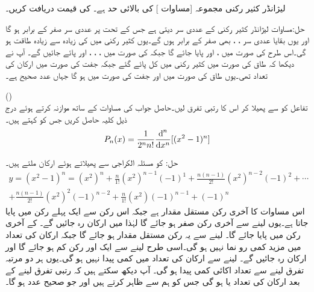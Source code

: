 لیژانڈر کثیر رکنی مجموعہ [مساوات ] کی بالائی حد  ہے۔ کی قیمت دریافت کریں۔

حل:مساوات  لیژانڈر کثیر رکنی کے عددی سر دیتی ہے جس کے تحت  پر عددی سر صفر  کے برابر ہو گا اور یوں بقایا عددی سر ، ،  بھی صفر کے برابر ہوں گے۔یوں کثیر رکنی میں  کی زیادہ سے زیادہ طاقت  ہو گی۔اس طرح  کی صورت میں ،  اور  پایا جائے گا جبکہ  کی صورت میں ، ، ،  اور  پائے جائیں گے۔ آپ نے دیکھا کہ طاق  کی صورت میں کثیر رکنی میں کل  پائے گئے جبکہ جفت  کی صورت میں ارکان کی تعداد  تھی۔یوں طاق  کی صورت میں   اور جفت  کی صورت میں  ہو گا جہاں  عدد صحیح ہے۔ 

\quad ()\\
تفاعل  کو  سے پھیلا کر اس کا  رتبی تفرق لیں۔حاصل جواب کی مساوات  کے ساتھ موازنہ کرتے ہوئے درج ذیل کلیہ حاصل کریں جس کو  کہتے ہیں۔
\begin{align}\label{مساوات_بیسل_روڈریگیس_مساوات}
P_n(x)=\frac{1}{2^n n!}\frac{\dif^{\,n}}{\dif x^n}[(x^2-1)^n]
\end{align}

حل: کو مسئلہ الکراجی سے پھیلاتے ہوئے  ارکان ملتے ہیں۔
\begin{multline}\label{مساوات_سوال_بیسل_الکرازی_الف}
y=(x^2-1)^n=(x^2)^n+\frac{n}{1!}(x^2)^{n-1}(-1)^1+\frac{n(n-1)}{2!}(x^2)^{n-2}(-1)^2+\cdots   \\
+\frac{n(n-1)}{2!}(x^2)^2(-1)^{n-2}+\frac{n}{1!}(x^2)(-1)^{n-1}+(-1)^n
\end{multline}
اس مساوات کا آخری رکن مستقل مقدار  ہے جبکہ اس رکن سے ایک پہلے  رکن میں  پایا جاتا ہے۔یوں  لینے سے آخری رکن صفر ہو جائے گا لہٰذا  میں  ارکان رہ جائیں گے۔ کے آخری رکن میں  پایا جائے گا۔ لینے سے یہ رکن مستقل مقدار ہو جائے گا جبکہ ارکان کی تعداد میں مزید کمی رو نما نہیں ہو گی۔اسی طرح  لینے سے ایک اور رکن کم ہو جائے گا اور  ارکان رہ جائیں گے۔ لینے سے ارکان کی تعداد میں کمی پیدا نہیں ہو گی۔یوں ہر دو مرتبہ تفرق لینے سے تعداد اکائی کمی پیدا ہو گی۔ آپ دیکھ سکتے ہیں کہ  رتبی تفرق  لینے کے بعد ارکان کی تعداد   یا  ہو گی جس کو ہم  سے ظاہر کرتے ہیں اور جو صحیح عدد ہو گا۔
 
